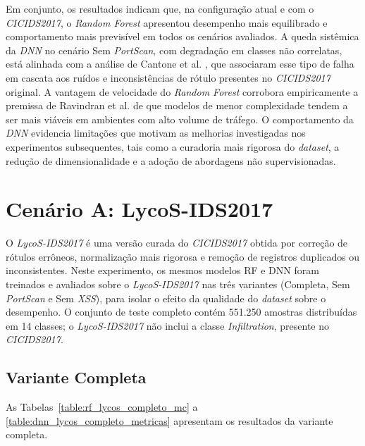 Em conjunto, os resultados indicam que, na configuração atual e com o \textit{CICIDS2017}, o \textit{Random Forest} apresentou desempenho mais equilibrado e comportamento mais previsível em todos os cenários avaliados. A queda sistêmica da \textit{DNN} no cenário Sem \textit{PortScan}, com degradação em classes não correlatas, está alinhada com a análise de Cantone et al. \cite{cantone2024}, que associaram esse tipo de falha em cascata aos ruídos e inconsistências de rótulo presentes no \textit{CICIDS2017} original. A vantagem de velocidade do \textit{Random Forest} corrobora empiricamente a premissa de Ravindran et al. \cite{ravindran2025} de que modelos de menor complexidade tendem a ser mais viáveis em ambientes com alto volume de tráfego. O comportamento da \textit{DNN} evidencia limitações que motivam as melhorias investigadas nos experimentos subsequentes, tais como a curadoria mais rigorosa do \textit{dataset}, a redução de dimensionalidade e a adoção de abordagens não supervisionadas.

\section{Cenário A: LycoS-IDS2017}

O \textit{LycoS-IDS2017} é uma versão curada do \textit{CICIDS2017} obtida por correção de rótulos errôneos, normalização mais rigorosa e remoção de registros duplicados ou inconsistentes. Neste experimento, os mesmos modelos RF e DNN foram treinados e avaliados sobre o \textit{LycoS-IDS2017} nas três variantes (Completa, Sem \textit{PortScan} e Sem \textit{XSS}), para isolar o efeito da qualidade do \textit{dataset} sobre o desempenho. O conjunto de teste completo contém 551.250 amostras distribuídas em 14 classes; o \textit{LycoS-IDS2017} não inclui a classe \textit{Infiltration}, presente no \textit{CICIDS2017}.

\subsection{Variante Completa}

As Tabelas~\ref{table:rf_lycos_completo_mc} a \ref{table:dnn_lycos_completo_metricas} apresentam os resultados da variante completa.







